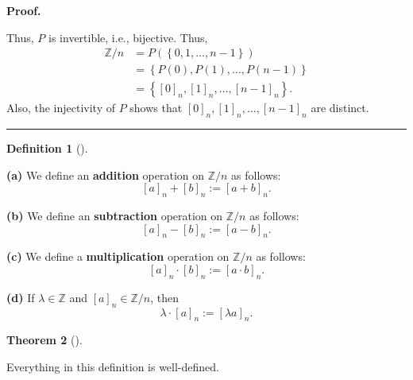 \documentclass[numbers=enddot,12pt,final,onecolumn,notitlepage]{scrartcl}%
\numberwithin{exer}{subsection}
\theoremstyle{definition}
\newtheorem{theo}{Theorem}[subsection]
\newenvironment{theorem}[1][]
{\begin{theo}[#1]\begin{leftbar}}
{\end{leftbar}\end{theo}}
\newtheorem{defi}[theo]{Definition}
\newenvironment{definition}[1][]
{\begin{defi}[#1]\begin{leftbar}}
{\end{leftbar}\end{defi}}
\newenvironment{proof}[1][Proof]{\noindent\textbf{#1.} }{\ \rule{0.5em}{0.5em}}
\begin{document}
\begin{proof}
\begin{itemize}
\end{itemize}

Thus, $P$ is invertible, i.e., bijective. Thus,%
\begin{align*}
\mathbb{Z}/n  & =P\left(  \left\{  0,1,\ldots,n-1\right\}  \right)  \\
& =\left\{  P\left(  0\right)  ,P\left(  1\right)  ,\ldots,P\left(
n-1\right)  \right\}  \\
& =\left\{  \left[  0\right]  _{n},\left[  1\right]  _{n},\ldots,\left[
n-1\right]  _{n}\right\}  .
\end{align*}
Also, the injectivity of $P$ shows that $\left[  0\right]  _{n},\left[
1\right]  _{n},\ldots,\left[  n-1\right]  _{n}$ are distinct.
\end{proof}

\begin{definition}
\textbf{(a)} We define an \textbf{addition} operation on $\mathbb{Z}/n$ as
follows:%
\[
\left[  a\right]  _{n}+\left[  b\right]  _{n}:=\left[  a+b\right]  _{n}.
\]


\textbf{(b)} We define an \textbf{subtraction }operation on $\mathbb{Z}/n$ as
follows:%
\[
\left[  a\right]  _{n}-\left[  b\right]  _{n}:=\left[  a-b\right]  _{n}.
\]


\textbf{(c)} We define a \textbf{multiplication} operation on $\mathbb{Z}/n$
as follows:%
\[
\left[  a\right]  _{n}\cdot\left[  b\right]  _{n}:=\left[  a\cdot b\right]
_{n}.
\]


\textbf{(d)} If $\lambda\in\mathbb{Z}$ and $\left[  a\right]  _{n}%
\in\mathbb{Z}/n$, then
\[
\lambda\cdot\left[  a\right]  _{n}:=\left[  \lambda a\right]  _{n}.
\]

\end{definition}

\begin{theorem}
Everything in this definition is well-defined.
\end{theorem}
\end{document}
